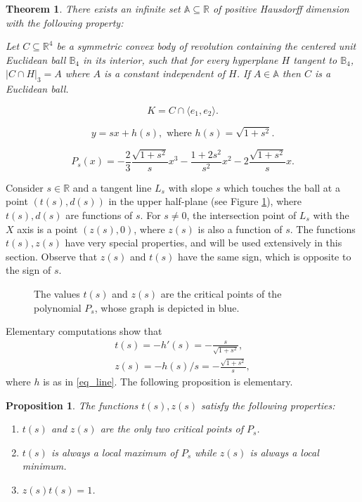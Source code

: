 \documentclass[10pt,a4paper]{amsart}
\newtheorem{theorem}{Theorem}
\newtheorem{proposition}{Proposition}
\def \B{\mathbb B}
\def \R{\mathbb R}
\newcommand \vol[2][3]{\left|#2\right|_{#1}}
\begin{document}
\begin{theorem}
	\label{thm_main}
	There exists an infinite set $\mathbb A \subseteq \R$ of positive Hausdorff dimension with the following property:

	Let $C \subseteq \R^4$ be a symmetric convex body of revolution containing the centered unit Euclidean ball $\B_4$ in its interior, such that for every hyperplane $H$ tangent to $\B_4$, $\vol[3]{C \cap H} = A$ where $A$ is a constant independent of $H$.
	If $A \in \mathbb A$ then $C$ is a Euclidean ball.
\end{theorem}

\begin{equation}
	\label{def_K}
	K = C \cap \langle e_1, e_2 \rangle. %
\end{equation}

\begin{equation}
	\label{eq_line}
	y = s x + h(s), \text{ where } h(s) = \sqrt{1+s^2}.
\end{equation}

	\begin{equation}
		\label{eq_def_Ps}
		P_{s}(x) = -\frac 23 \frac{\sqrt{1+s^2}}{s} x^3 - \frac{1+2s^2}{s^2} x^2 -2 \frac{\sqrt{1+s^2}}{s} x.
	\end{equation}

Consider $s \in \R$ and a tangent line $L_s$ with slope $s$ which touches the ball at a point $(t(s),d(s) )$ in the upper half-plane (see Figure \ref{fig_critical}), where $t(s), d(s)$ are functions of $s$.
For $s\neq 0$, the intersection point of $L_s$ with the $X$ axis is a point $(z(s),0)$, where $z(s)$ is also a function of $s$.
The functions $t(s),z(s)$ have very special properties, and will be used extensively in this section.
Observe that $z(s)$ and $t(s)$ have the same sign, which is opposite to the sign of $s$.
	\begin{figure}
		\caption{The values $t(s)$ and $z(s)$ are the critical points of the polynomial $P_s$, whose graph is depicted in blue.}
		\label{fig_critical}
		
	\end{figure}
Elementary computations show that
\begin{align}
	\label{eq_t}
	t(s) = -h'(s) = - \frac {s}{\sqrt{1+s^2}},\\
	\label{eq_z}
	z(s) = -h(s)/s = - \frac {\sqrt{1+s^2}}{s},
\end{align}
where $h$ is as in \eqref{eq_line}.
The following proposition is elementary.
\begin{proposition}
	\label{prop_zt}
	The functions $t(s), z(s)$ satisfy the following properties:
	\begin{enumerate}[label = (\alph*), ref = \alph* ]
		\item $t(s)$ and $z(s)$ are the only two critical points of $P_{s}$.
		\item $t(s)$ is always a local maximum of $P_{s}$ while $z(s)$ is always a local minimum.
		\item $z(s) t(s) = 1$. \label{eq_zt_product}
	\end{enumerate}
\end{proposition}
\end{document}
